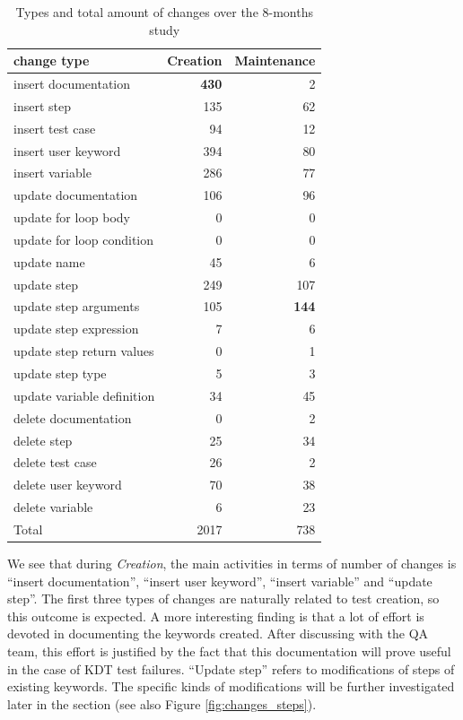 \begin{table}
\caption{Types and total amount of changes over the 8-months study}
\label{table:total_changes}
\centering
\begin{tabular}{lrr}
\toprule
change type &  Creation &  Maintenance \\
\midrule
insert documentation          &       \textbf{430} &            2 \\
insert step                   &       135 &           62 \\
insert test case              &        94 &           12 \\
insert user keyword           &       394 &           80 \\
insert variable               &       286 &           77 \\
update documentation       &       106 &           96 \\
update for loop body       &         0 &            0 \\
update for loop condition  &         0 &            0 \\
update name                &        45 &            6 \\
update step                &       249 &          107 \\
update step arguments      &       105 &          \textbf{144} \\
update step expression     &         7 &            6 \\
update step return values  &         0 &            1 \\
update step type           &         5 &            3 \\
update variable definition &        34 &           45 \\
delete documentation       &         0 &            2 \\
delete step                &        25 &           34 \\
delete test case           &        26 &            2 \\
delete user keyword        &        70 &           38 \\
delete variable            &         6 &           23 \\
\midrule
Total                      &      2017 &          738 \\
\bottomrule
\end{tabular}
\end{table}

We see that during \emph{Creation}, the main activities in terms of number of changes is ``insert documentation'', ``insert user keyword'', ``insert variable'' and ``update step''. The first three types of changes are naturally related to test creation, so this outcome is expected. A more interesting finding is that a lot of effort is devoted in documenting the keywords created. After discussing with the QA team, this effort is justified by the fact that this documentation will prove useful in the case of KDT test failures. ``Update step'' refers to modifications of steps of existing keywords. The specific kinds of modifications will be further investigated later in the section (see also Figure \ref{fig:changes_steps}).
  

